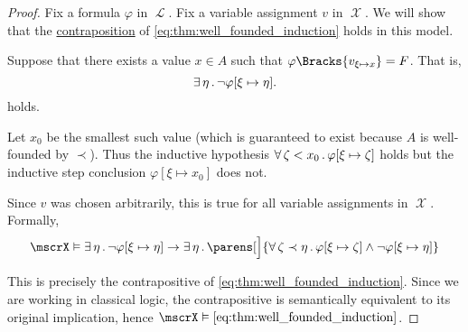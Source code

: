 \begin{proof}
  Fix a formula \( \varphi \) in \( \mscrL \). Fix a variable assignment \( v \) in \( \mscrX \). We will show that the \hyperref[def:material_implication/contrapositive]{contraposition} of \eqref{eq:thm:well_founded_induction} holds in this model.

  Suppose that there exists a value \( x \in A \) such that \( \varphi\Bracks{v_{\xi \mapsto x}} = F \). That is,
  \begin{equation*}
    \exists \thinspace \eta \thinspace . \thinspace \neg \varphi[\xi \mapsto \eta].
  \end{equation*}
  holds.

  Let \( x_0 \) be the smallest such value (which is guaranteed to exist because \( A \) is well-founded by \( \prec \)). Thus the inductive hypothesis \( \forall \thinspace \zeta < x_0 \thinspace . \thinspace \varphi[\xi \mapsto \zeta] \) holds but the inductive step conclusion \( \varphi[\xi \mapsto x_0] \) does not.

  Since \( v \) was chosen arbitrarily, this is true for all variable assignments in \( \mscrX \). Formally,
  \begin{equation}\label{eq:thm:well_founded_induction/contraposition}
    \mscrX
    \vDash
    \qexists \eta \neg \varphi[\xi \mapsto \eta]
    \rightarrow
    \qexists \eta
    \parens[\Big]
      {
        \qforall {\zeta \prec \eta} \varphi[\xi \mapsto \zeta] \wedge \neg \varphi[\xi \mapsto \eta]
      }
  \end{equation}

  This is precisely the contrapositive of \eqref{eq:thm:well_founded_induction}. Since we are working in classical logic, the contrapositive is semantically equivalent to its original implication, hence \( \mscrX \vDash \eqref{eq:thm:well_founded_induction} \).
\end{proof}

